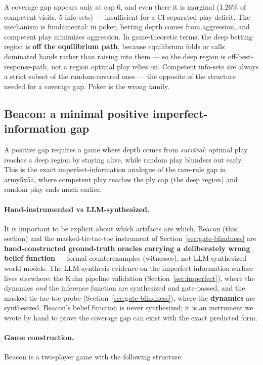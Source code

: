 \documentclass[11pt]{article}
\theoremstyle{remark}
\begin{document}
A coverage gap appears only at cap 6, and even there it is marginal (1.26\% of competent visits, 5 info-sets) --- insufficient for a CI-separated play deficit. The mechanism is fundamental: in poker, betting depth comes from aggression, and competent play minimizes aggression. In game-theoretic terms, the deep betting region is \textbf{off the equilibrium path}, because equilibrium folds or calls dominated hands rather than raising into them --- so the deep region is off-best-response-path, not a region optimal play relies on. Competent info-sets are always a strict subset of the random-covered ones --- the opposite of the structure needed for a coverage gap. Poker is the wrong family.

\subsection{Beacon: a minimal positive imperfect-information gap}
\label{sec:beacon}

A positive gap requires a game where depth comes from \emph{survival}: optimal play reaches a deep region by staying alive, while random play blunders out early. This is the exact imperfect-information analogue of the rare-rule gap in army5x5a, where competent play reaches the ply cap (the deep region) and random play ends much earlier.

\paragraph{Hand-instrumented vs LLM-synthesized.} It is important to be explicit about which artifacts are which. Beacon (this section) and the masked-tic-tac-toe instrument of Section~\ref{sec:gate-blindness} are \textbf{hand-constructed ground-truth oracles carrying a deliberately wrong belief function} --- formal counterexamples (witnesses), not LLM-synthesized world models. The LLM-synthesis evidence on the imperfect-information surface lives elsewhere: the Kuhn pipeline validation (Section~\ref{sec:imperfect}), where the dynamics \emph{and} the inference function are synthesized and gate-passed, and the masked-tic-tac-toe probe (Section~\ref{sec:gate-blindness}), where the \textbf{dynamics} are synthesized. Beacon's belief function is never synthesized; it is an instrument we wrote by hand to prove the coverage gap can exist with the exact predicted form.

\paragraph{Game construction.} Beacon is a two-player game with the following structure:
\end{document}
